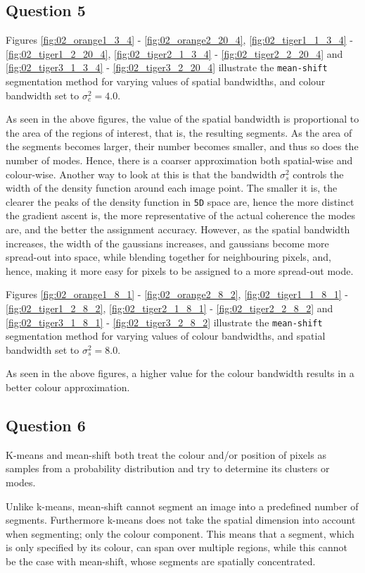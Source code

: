 \subsection{Question 5}

Figures \ref{fig:02_orange1_3_4} - \ref{fig:02_orange2_20_4},
\ref{fig:02_tiger1_1_3_4} - \ref{fig:02_tiger1_2_20_4},
\ref{fig:02_tiger2_1_3_4} - \ref{fig:02_tiger2_2_20_4} and
\ref{fig:02_tiger3_1_3_4} - \ref{fig:02_tiger3_2_20_4} illustrate
the \texttt{mean-shift} segmentation method for varying values of spatial
bandwidths, and colour bandwidth set to $\sigma_c^2 = 4.0$.

As seen in the above figures, the value of the spatial bandwidth is proportional
to the area of the regions of interest, that is, the resulting segments. As
the area of the segments becomes larger, their number becomes smaller, and thus
so does the number of modes. Hence, there is a coarser approximation both
spatial-wise and colour-wise. Another way to look at this is that the
bandwidth \texttt{$\sigma_s^2$} controls the width of the density function
around each image point. The smaller it is, the clearer the peaks of the
density function in \texttt{5D} space are, hence the more distinct the gradient
ascent is, the more representative of the actual coherence the modes are,
and the better the assignment accuracy.
However, as the spatial bandwidth increases, the width of the gaussians increases,
and gaussians become more spread-out into space, while blending
together for neighbouring pixels, and, hence, making it more easy for pixels
to be assigned to a more spread-out mode.

Figures \ref{fig:02_orange1_8_1} - \ref{fig:02_orange2_8_2},
\ref{fig:02_tiger1_1_8_1} - \ref{fig:02_tiger1_2_8_2},
\ref{fig:02_tiger2_1_8_1} - \ref{fig:02_tiger2_2_8_2} and
\ref{fig:02_tiger3_1_8_1} - \ref{fig:02_tiger3_2_8_2} illustrate
the \texttt{mean-shift} segmentation method for varying values of colour
bandwidths, and spatial bandwidth set to $\sigma_s^2 = 8.0$.

As seen in the above figures, a higher value for the colour bandwidth results
in a better colour approximation.


\subsection{Question 6}

K-means and mean-shift both treat the colour and/or position of pixels as
samples from a probability distribution and try to determine its clusters or
modes.

Unlike k-means, mean-shift cannot segment an image into a predefined number of
segments. Furthermore k-means does not take the spatial dimension into account
when segmenting; only the colour component. This means that a segment, which is
only specified by its colour, can span over multiple regions, while this
cannot be the case with mean-shift, whose segments are spatially concentrated.
